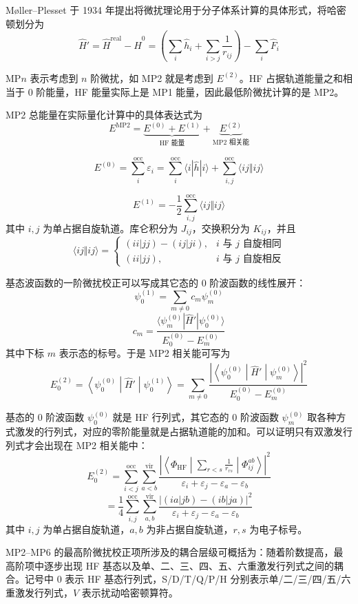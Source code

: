 M{\o}ller--Plesset 于 1934 年提出将微扰理论用于分子体系计算的具体形式，将哈密顿划分为
\[
\hat H'=\hat H^{\mathrm{real}}-\hat H^0
=
\left(\sum_i \hat h_i+\sum_{i>j}\frac{1}{r_{ij}}\right)-\sum_i \hat F_i
\]

MP$n$ 表示考虑到 $n$ 阶微扰，如 MP2 就是考虑到 $E^{(2)}$。HF 占据轨道能量之和相当于 0 阶能量，HF 能量实际上是 MP1 能量，因此最低阶微扰计算的是 MP2。

MP2 总能量在实际量化计算中的具体表达式为
\[
E^{\mathrm{MP2}}
=
\underbrace{E^{(0)}+E^{(1)}}_{\text{HF 能量}}
+
\underbrace{E^{(2)}}_{\text{MP2 相关能}}
\]

\[
E^{(0)}
=
\sum_i^{\mathrm{occ}} \varepsilon_i
=
\sum_i^{\mathrm{occ}} \langle i|\hat h|i\rangle
+
\sum_{i,j}^{\mathrm{occ}} \langle ij\Vert ij\rangle
\]

\[
E^{(1)}
=
-\frac{1}{2}\sum_{i,j}^{\mathrm{occ}} \langle ij\Vert ij\rangle
\]
其中 $i,j$ 为单占据自旋轨道。库仑积分为 $J_{ij}$，交换积分为 $K_{ij}$，并且
\[
\langle ij\Vert ij\rangle=
\begin{cases}
(ii|jj)-(ij|ji), & i \text{ 与 } j \text{ 自旋相同} \\
(ii|jj), & i \text{ 与 } j \text{ 自旋相反}
\end{cases}
\]

基态波函数的一阶微扰校正可以写成其它态的 0 阶波函数的线性展开：
\[
\psi_0^{(1)}=\sum_{m\ne 0} c_m\psi_m^{(0)}
\]
\[
c_m=
\frac{\langle \psi_m^{(0)}|\hat H'|\psi_0^{(0)}\rangle}{E_0^{(0)}-E_m^{(0)}}
\]
其中下标 $m$ 表示态的标号。于是 MP2 相关能可写为
\[
E_0^{(2)}
=
\left\langle \psi_0^{(0)} \middle| \hat H' \middle| \psi_0^{(1)} \right\rangle
=
\sum_{m\ne 0}
\frac{\left|\left\langle \psi_0^{(0)} \middle| \hat H' \middle| \psi_m^{(0)} \right\rangle\right|^2}{E_0^{(0)}-E_m^{(0)}}
\]

基态的 0 阶波函数 $\psi_0^{(0)}$ 就是 HF 行列式，其它态的 0 阶波函数 $\psi_m^{(0)}$ 取各种方式激发的行列式，对应的零阶能量就是占据轨道能的加和。可以证明只有双激发行列式才会出现在 MP2 相关能中：
\[
E_0^{(2)}
=
\sum_{i<j}^{\mathrm{occ}}\sum_{a<b}^{\mathrm{vir}}
\frac{
\left|
\left\langle \Phi_{\mathrm{HF}}
\middle|
\sum_{r<s}\frac{1}{r_{rs}}
\middle|
\Phi_{ij}^{ab}
\right\rangle
\right|^2
}{
\varepsilon_i+\varepsilon_j-\varepsilon_a-\varepsilon_b
}
\]
\[
=
\frac{1}{4}\sum_{i,j}^{\mathrm{occ}}\sum_{a,b}^{\mathrm{vir}}
\frac{\left|(ia|jb)-(ib|ja)\right|^2}{\varepsilon_i+\varepsilon_j-\varepsilon_a-\varepsilon_b}
\]
其中 $i,j$ 为单占据自旋轨道，$a,b$ 为非占据自旋轨道，$r,s$ 为电子标号。

MP2--MP6 的最高阶微扰校正项所涉及的耦合层级可概括为：随着阶数提高，最高阶项中逐步出现 HF 基态以及单、二、三、四、五、六重激发行列式之间的耦合。记号中 0 表示 HF 基态行列式，S/D/T/Q/P/H 分别表示单/二/三/四/五/六重激发行列式，$V$ 表示扰动哈密顿算符。

